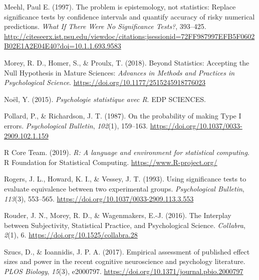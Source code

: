 \documentclass[
  a4paper,11pt,twoside,onecolumn,openright,final,oldfontcommands]{memoir}
\newlength{\cslhangindent}
\newlength{\cslentryspacingunit} %
\newenvironment{CSLReferences}[2] %
 {%
  \setlength{\parindent}{0pt}
  \ifodd #1
  \let\oldpar\par
  \def\par{\hangindent=\cslhangindent\oldpar}
  \fi
  \setlength{\parskip}{#2\cslentryspacingunit}
 }%
 {}
\theoremstyle{definition}
\theoremstyle{definition}
\theoremstyle{definition}
\theoremstyle{definition}
\theoremstyle{remark}
\begin{document}
\begin{CSLReferences}{1}{0}
\leavevmode{}%
Meehl, Paul E. (1997). The problem is epistemology, not statistics: {Replace} significance tests by confidence intervals and quantify accuracy of risky numerical predictions. \emph{What If There Were No Significance Tests?}, 393--425. \url{http://citeseerx.ist.psu.edu/viewdoc/citations;jsessionid=72FF987997EFB5F0602B02E1A2E04E40?doi=10.1.1.693.9583}

\leavevmode{}%
Morey, R. D., Homer, S., \& Proulx, T. (2018). Beyond {Statistics}: {Accepting} the {Null} {Hypothesis} in {Mature} {Sciences}: \emph{Advances in Methods and Practices in Psychological Science}. \url{https://doi.org/10.1177/2515245918776023}

\leavevmode{}%
Noël, Y. (2015). \emph{Psychologie statistique avec {R}}. EDP SCIENCES.

\leavevmode{}%
Pollard, P., \& Richardson, J. T. (1987). On the probability of making {Type} {I} errors. \emph{Psychological Bulletin}, \emph{102}(1), 159--163. \url{https://doi.org/10.1037/0033-2909.102.1.159}

\leavevmode{}%
R Core Team. (2019). \emph{R: A language and environment for statistical computing}. R Foundation for Statistical Computing. \url{https://www.R-project.org/}

\leavevmode{}%
Rogers, J. L., Howard, K. I., \& Vessey, J. T. (1993). Using significance tests to evaluate equivalence between two experimental groups. \emph{Psychological Bulletin}, \emph{113}(3), 553--565. \url{https://doi.org/10.1037/0033-2909.113.3.553}

\leavevmode{}%
Rouder, J. N., Morey, R. D., \& Wagenmakers, E.-J. (2016). The {Interplay} between {Subjectivity}, {Statistical} {Practice}, and {Psychological} {Science}. \emph{Collabra}, \emph{2}(1), 6. \url{https://doi.org/10.1525/collabra.28}

\leavevmode{}%
Szucs, D., \& Ioannidis, J. P. A. (2017). Empirical assessment of published effect sizes and power in the recent cognitive neuroscience and psychology literature. \emph{PLOS Biology}, \emph{15}(3), e2000797. \url{https://doi.org/10.1371/journal.pbio.2000797}


\end{CSLReferences}
\end{document}
